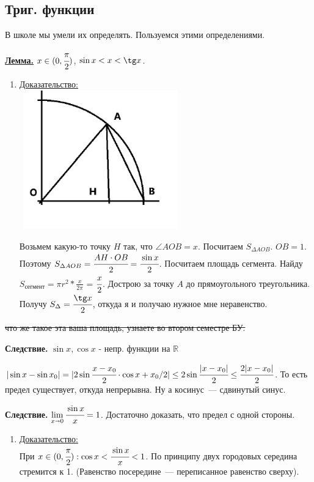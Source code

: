 \documentclass{article}
\newcommand{\thmm}[1]{\underline{\textbf{#1}}}
\newcommand{\prooff}[1]{{\underline{Доказательство:}} \\ }
\begin{document}
\subsection{Триг. функции}

В школе мы умели их определять. Пользуемся этими определениями.

\thmm{Лемма.}
 $x \in (0, \cfrac{\pi}{2})$, $\sin x < x < \tg x$.
 
\begin{enumerate}
    \item[] \prooff{}
    \includegraphics[width=7cm, height=6cm]{images/trig_function_lemm.png}
    
    Возьмем какую-то точку $H$ так, что $\angle AOB = x$. Посчитаем $S_{\Delta AOB}$. $OB = 1$. Поэтому $S_{\Delta AOB} = \cfrac{AH \cdot OB}{2} = \cfrac{\sin x}{2}$. Посчитаем площадь сегмента. Найду $S_{\text{сегмент}} = \pi r^2 * \frac{x}{2\pi}$ = $\cfrac{x}{2}$. Дострою за точку $A$ до прямоугольного треугольника. Получу $S_{\Delta} = \cfrac{\tg x}{2}$, откуда я и получаю нужное мне неравенство.
\end{enumerate}

 \sout{что же такое эта ваша площадь, узнаете во втором семестре БУ.}

\textbf{Следствие.} $\sin x, \cos x$ - непр. функции на $\mathbb{R}$

$|\sin x - \sin x_0| = |2 \sin \cfrac{x-x_0}{2}\cdot \cos {x+x_0}/2| \leq 2 \sin \cfrac{|x-x_0|}{2}\leq  \cfrac{2|x-x_0|}{2} $. То есть предел существует, откуда непрерывна. Ну а косинус~--- сдвинутый синус.

\textbf{Следствие.} $\lim\limits_{x\shortrightarrow 0} \cfrac{\sin x}{x} = 1$. Достаточно доказать, что предел с одной стороны.
\begin{enumerate}
    \item[] \prooff{}
    При $x \in (0,\cfrac{\pi}{2}): \cos x< \cfrac{\sin x }{x}<1$. По принципу двух городовых середина стремится к 1. (Равенство посередине~--- переписанное равенство сверху).
\end{enumerate}
\end{document}
